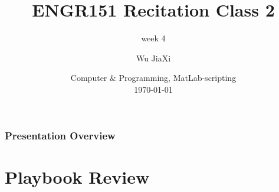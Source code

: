 \documentclass[
	11pt, %
]{beamer}
\title[Computer \& Programming, MATLAB]{ENGR151 Recitation Class 2} %
\subtitle{week 4} %
\author[Wu JiaXi]{Wu JiaXi} %
\institute[UM-SJTU joint institute]{UM-SJTU joint institute \\ \smallskip \textit{nina$\_$nhk@sjtu.edu.cn}} %
\date[\today]{Computer $\&$ Programming, MatLab-scripting \\ \today} %
\begin{document}

\begin{frame}
	\titlepage %
\end{frame}



\begin{frame}
	\frametitle{Presentation Overview} %
	
	\tableofcontents %
\end{frame}


\section{Playbook Review} %
\end{document}
